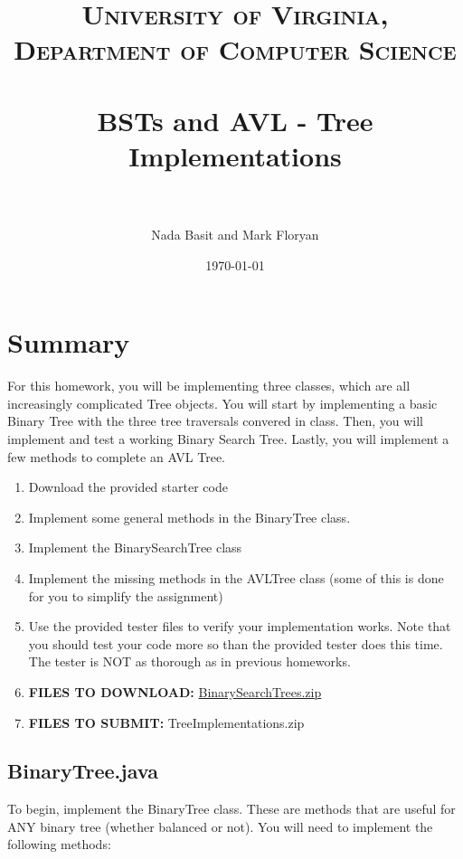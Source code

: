 \documentclass[paper=a4, fontsize=11pt, parskip=full]{scrartcl} %
\title{
\normalfont \normalsize
\textsc{University of Virginia, Department of Computer Science} \\ [25pt] %
\horrule{0.5pt} \\[0.4cm] %
\huge BSTs and AVL - Tree Implementations \\ %
\horrule{2pt} \\[0.5cm] %
}
\author{Nada Basit and Mark Floryan}
\date{\normalsize\today} %
\numberwithin{equation}{section} %
\numberwithin{figure}{section} %
\numberwithin{table}{section} %
\begin{document}
\maketitle %


\section{Summary}

For this homework, you will be implementing three classes, which are all increasingly complicated Tree objects. You will start by implementing a basic Binary Tree with the three tree traversals convered in class. Then, you will implement and test a working Binary Search Tree. Lastly, you will implement a few methods to complete an AVL Tree.

\begin{enumerate}
	\item Download the provided starter code
	\item Implement some general methods in the BinaryTree class.
	\item Implement the BinarySearchTree class
	\item Implement the missing methods in the AVLTree class (some of this is done for you to simplify the assignment)
	\item Use the provided tester files to verify your implementation works. Note that you should test your code more so than the provided tester does this time. The tester is NOT as thorough as in previous homeworks.
	\item \textbf{FILES TO DOWNLOAD:} \href{https://uva-cs.github.io/dsa1/homeworks/BinarySearchTrees/code/BinarySearchTrees.zip}{BinarySearchTrees.zip}
	\item \textbf{FILES TO SUBMIT:} TreeImplementations.zip
\end{enumerate}


\subsection{BinaryTree.java}

To begin, implement the BinaryTree class. These are methods that are useful for ANY binary tree (whether balanced or not). You will need to implement the following methods:
\end{document}
